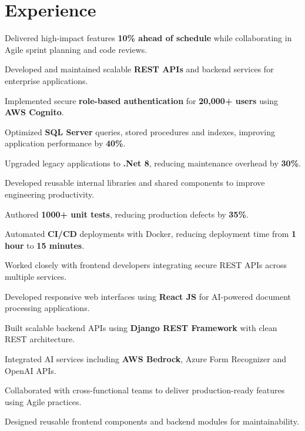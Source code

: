 \documentclass[]{deedy-resume-reversed}
\begin{document}
\begin{minipage}[t]{0.60\textwidth}

\section{Experience}

\vspace{\topsep}
\begin{tightemize}
\item Delivered high-impact features \textbf{10\% ahead of schedule} while collaborating in Agile sprint planning and code reviews.
\item Developed and maintained scalable \textbf{REST APIs} and backend services for enterprise applications.
\item Implemented secure \textbf{role-based authentication} for \textbf{20,000+ users} using \textbf{AWS Cognito}.
\item Optimized \textbf{SQL Server} queries, stored procedures and indexes, improving application performance by \textbf{40\%}.
\item Upgraded legacy applications to \textbf{.Net 8}, reducing maintenance overhead by \textbf{30\%}.
\item Developed reusable internal libraries and shared components to improve engineering productivity.
\item Authored \textbf{1000+ unit tests}, reducing production defects by \textbf{35\%}.
\item Automated \textbf{CI/CD} deployments with Docker, reducing deployment time from \textbf{1 hour} to \textbf{15 minutes}.
\item Worked closely with frontend developers integrating secure REST APIs across multiple services.
\end{tightemize}

\begin{tightemize}
\item Developed responsive web interfaces using \textbf{React JS} for AI-powered document processing applications.
\item Built scalable backend APIs using \textbf{Django REST Framework} with clean REST architecture.
\item Integrated AI services including \textbf{AWS Bedrock}, Azure Form Recognizer and OpenAI APIs.
\item Collaborated with cross-functional teams to deliver production-ready features using Agile practices.
\item Designed reusable frontend components and backend modules for maintainability.
\end{tightemize}
\sectionsep

\end{minipage}
\end{document}
